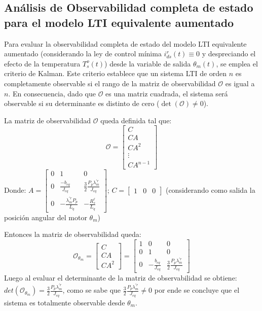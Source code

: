 \documentclass[blue,fullpaper]{ludusofficial}  %
\begin{document}
\subsection{Análisis de Observabilidad completa de estado para el modelo LTI equivalente aumentado}
Para evaluar la observabilidad completa de estado del modelo LTI equivalente aumentado (considerando la ley de control mínima $i_{ds}^{r}(t) \equiv 0$  y despreciando el efecto de la temperatura $T_{s}^{o}(t)$) desde la variable de salida $\theta_m(t)$, se emplea el criterio de Kalman. Este criterio establece que un sistema LTI de orden $n$ es completamente observable si el rango de la matriz de observabilidad $\mathcal{O}$ es igual a $n$. En consecuencia, dado que $\mathcal{O}$ es una matriz cuadrada, el sistema será observable si su determinante es distinto de cero ($\det(\mathcal{O}) \neq 0$).

La matriz de observabilidad $\mathcal{O}$ queda definida tal que:
\begin{equation}
\mathcal{O} = \begin{bmatrix}
C \\
CA \\
CA^2 \\
\vdots \\
CA^{n-1}
\end{bmatrix}
\end{equation}
Donde: 
$
A = \begin{bmatrix}
0 & 1 & 0 \\
0 & \frac{-b_{eq}}{J_{eq}} & \frac{3}{2}\frac{P_p\lambda_{m}^{'r}}{J_{eq}} \\
0 & -\frac{\lambda^{'r}_{m}P_p}{L_q} & -\frac{R^\ell_s}{L_q}
\end{bmatrix}
$;
$C=\begin{bmatrix}
    1& 0& 0
\end{bmatrix}$ (considerando como salida la posición
angular del motor $\theta_m$) 

Entonces la matriz de observabilidad queda: 
\begin{equation}
    \mathcal{O}_{\theta_m} = \begin{bmatrix}
C \\
CA \\
CA^2
\end{bmatrix}=\begin{bmatrix}
1 & 0 & 0 \\
0 & 1 & 0 \\
0 & -\frac{b_{eq}}{J_{eq}} & \frac{3}{2}\frac{P_p\lambda_{m}^{'r}}{J_{eq}}
\end{bmatrix}
\end{equation}
Luego al evaluar el determinante de la matriz de observabilidad se obtiene: $det(\mathcal{O}_{\theta_m})=\frac{3}{2}\frac{P_p\lambda_{m}^{'r}}{J_{eq}}$, como se sabe que $\frac{3}{2}\frac{P_p\lambda_{m}^{'r}}{J_{eq}} \neq 0$ por ende se concluye que el sistema es totalmente observable desde $\theta_m$.
\end{document}
